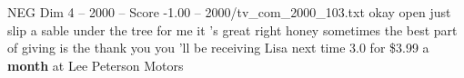 \begin{textsample}{NEG Dim 4 – 2000 – Score -1.00 – 2000/tv\_com\_2000\_103.txt}  \label{ex:f4_neg_030}
okay open just slip a sable under the tree for me it 's great right honey sometimes the best part of giving is the thank you you 'll be receiving Lisa next time 3.0 for \$3.99 a \textbf{month} at Lee Peterson Motors

\end{textsample}
